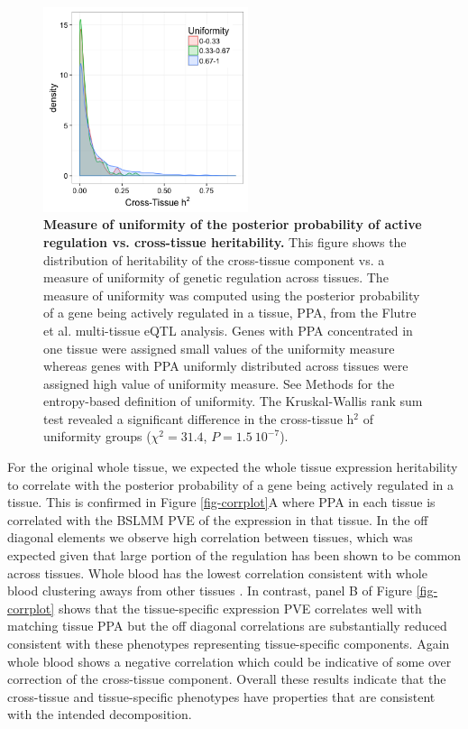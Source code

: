 \documentclass[10pt,letterpaper]{article}
\begin{document}
\begin{figure}[H]
\includegraphics[width=6cm]{Figures/Fig-CT-entropy.png}
\caption{{\bf Measure of uniformity of the posterior probability of active regulation vs. cross-tissue heritability.}
This figure shows the distribution of heritability of the cross-tissue component vs. a measure of uniformity of genetic regulation across tissues. 
The measure of uniformity was computed using the posterior probability of a gene being actively regulated in a tissue, PPA, from the Flutre et al. \cite{Flutre_2013} multi-tissue eQTL analysis. Genes with PPA concentrated in one tissue were assigned small values of the uniformity measure whereas genes with PPA uniformly distributed across tissues were assigned high value of uniformity measure. See Methods for the entropy-based definition of uniformity. The Kruskal-Wallis rank sum test revealed a significant difference in the cross-tissue h$^2$ of uniformity groups ($\chi^2 = 31.4$, $P = 1.5~10^{-7}$).}
\label{fig-ct-entropy}
\end{figure}


For the original whole tissue, we expected the whole tissue expression heritability to correlate with the posterior probability of a gene being actively regulated in a tissue. This is confirmed in Figure \ref{fig-corrplot}A where PPA in each tissue is correlated with the BSLMM PVE of the expression in that tissue. In the off diagonal elements we observe high correlation between tissues, which was expected given that large portion of the regulation has been shown to be common across tissues. Whole blood has the lowest correlation  consistent with whole blood clustering aways from other tissues \cite{Ardlie_2015}. In contrast, panel B of Figure \ref{fig-corrplot} shows that the tissue-specific expression PVE correlates well with matching tissue PPA but the off diagonal correlations are substantially reduced consistent with these phenotypes representing tissue-specific components. Again whole blood shows a negative correlation which could be indicative of some over correction of the cross-tissue component. Overall these results indicate that the cross-tissue and tissue-specific phenotypes have properties that are consistent with the intended decomposition.
\end{document}
